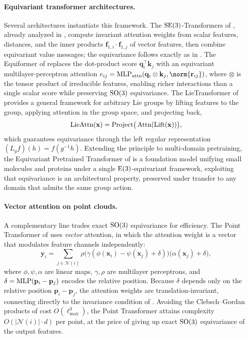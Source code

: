 \paragraph{Equivariant transformer architectures.}
Several architectures instantiate this framework. The $\operatorname{SE}(3)$-Transformers of
\citet{fuchs2020se3transformers}, already analyzed in ,
compute invariant attention weights from scalar features, distances, and the
inner products $\mathbf{f}_{1,i} \cdot \mathbf{f}_{1,j}$ of vector features, then
combine equivariant value messages; the equivariance follows exactly as in
. The Equiformer of
\citet{liao2022equiformer} replaces the dot-product score $\mathbf{q}_i^\top
\mathbf{k}_j$ with an equivariant multilayer-perceptron attention $e_{ij} =
\MLP_{\text{attn}}(\mathbf{q}_i \otimes \mathbf{k}_j, \norm{\mathbf{r}_{ij}})$,
where $\otimes$ is the tensor product of irreducible features, enabling richer
interactions than a single scalar score while preserving $\operatorname{SO}(3)$ equivariance.
The LieTransformer of \citet{hutchinson2020lietransformer} provides a general
framework for arbitrary Lie groups by lifting features to the group, applying
attention in the group space, and projecting back,
\begin{equation}
  \text{LieAttn}(\mathbf{x}) = \text{Project}\big(
    \operatorname{Attn}(\text{Lift}(\mathbf{x}))\big),
\end{equation}
which guarantees equivariance through the left regular representation $(L_g
f)(h) = f(g^{-1} h)$. Extending the principle to multi-domain pretraining, the
Equivariant Pretrained Transformer of \citet{jiao2024ept} is a foundation model
unifying small molecules and proteins under a single $\operatorname{E}(3)$-equivariant
framework, exploiting that equivariance is an architectural property, preserved
under transfer to any domain that admits the same group action.

\paragraph{Vector attention on point clouds.}
A complementary line trades exact $\operatorname{SO}(3)$ equivariance for efficiency. The Point
Transformer of \citet{zhao2021point} uses \emph{vector} attention, in which the
attention weight is a vector that modulates feature channels independently:
\begin{equation}
  \mathbf{y}_i = \sum_{j \in \mathcal{N}(i)}
    \rho\big(\gamma(\phi(\mathbf{x}_i) - \psi(\mathbf{x}_j) + \delta)\big)
    \big(\alpha(\mathbf{x}_j) + \delta\big),
\end{equation}
where $\phi, \psi, \alpha$ are linear maps, $\gamma, \rho$ are multilayer
perceptrons, and $\delta = \operatorname{MLP}(\mathbf{p}_i - \mathbf{p}_j)$ encodes the relative
position. Because $\delta$ depends only on the relative position $\mathbf{p}_i -
\mathbf{p}_j$, the attention weights are translation-invariant, connecting
directly to the invariance condition of
. Avoiding the Clebsch--Gordan products
of cost $O(\ell_{\max}^3)$, the Point Transformer attains complexity
$O(|\mathcal{N}(i)| \cdot d)$ per point, at the price of giving up exact $\operatorname{SO}(3)$
equivariance of the output features.

